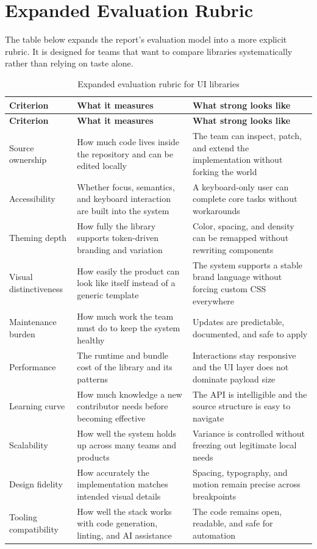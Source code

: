 \documentclass[11pt,twoside,a4paper]{article}
\begin{document}
\clearpage
\section{Expanded Evaluation Rubric}
The table below expands the report's evaluation model into a more explicit rubric. It is designed for teams that want to compare libraries systematically rather than relying on taste alone.

\begin{longtable}{@{}p{}p{}p{}@{}}
\caption{Expanded evaluation rubric for UI libraries}\label{tab:rubric}\\
\toprule
\textbf{Criterion} & \textbf{What it measures} & \textbf{What strong looks like} \\
\midrule
\endfirsthead
\toprule
\textbf{Criterion} & \textbf{What it measures} & \textbf{What strong looks like} \\
\midrule
\endhead
\bottomrule
\endfoot
Source ownership & How much code lives inside the repository and can be edited locally & The team can inspect, patch, and extend the implementation without forking the world \\
Accessibility & Whether focus, semantics, and keyboard interaction are built into the system & A keyboard-only user can complete core tasks without workarounds \\
Theming depth & How fully the library supports token-driven branding and variation & Color, spacing, and density can be remapped without rewriting components \\
Visual distinctiveness & How easily the product can look like itself instead of a generic template & The system supports a stable brand language without forcing custom CSS everywhere \\
Maintenance burden & How much work the team must do to keep the system healthy & Updates are predictable, documented, and safe to apply \\
Performance & The runtime and bundle cost of the library and its patterns & Interactions stay responsive and the UI layer does not dominate payload size \\
Learning curve & How much knowledge a new contributor needs before becoming effective & The API is intelligible and the source structure is easy to navigate \\
Scalability & How well the system holds up across many teams and products & Variance is controlled without freezing out legitimate local needs \\
Design fidelity & How accurately the implementation matches intended visual details & Spacing, typography, and motion remain precise across breakpoints \\
Tooling compatibility & How well the stack works with code generation, linting, and AI assistance & The code remains open, readable, and safe for automation \\
\end{longtable}
\end{document}
